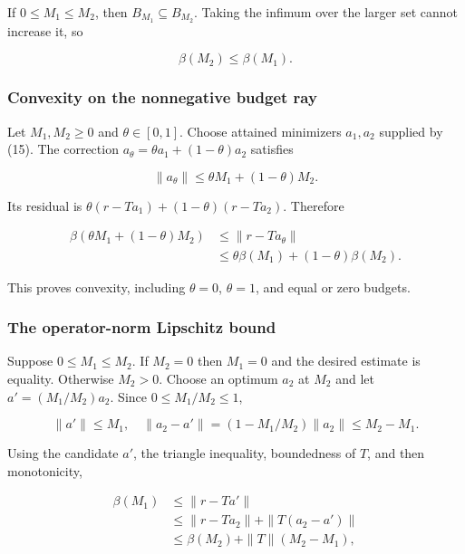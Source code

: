 \documentclass[11pt]{article}
\begin{document}
If \(0 \le M_1 \le M_2\), then \(B_{M_1} \subseteq B_{M_2}\). Taking the
infimum over the larger set cannot increase it, so

\[
\beta(M_2)\le\beta(M_1).
\]

\hypertarget{convexity-on-the-nonnegative-budget-ray}{%
\subsubsection{Convexity on the nonnegative budget
ray}\label{convexity-on-the-nonnegative-budget-ray}}

Let \(M_1,M_2 \ge 0\) and \(\theta \in [0,1]\). Choose attained
minimizers \(a_1,a_2\) supplied by (15). The correction
\(a_{\theta} = \theta a_1+(1-\theta )a_2\) satisfies

\[
\|a_\theta\|\le\theta M_1+(1-\theta)M_2.
\]

Its residual is \(\theta (r-Ta_1)+(1-\theta )(r-Ta_2)\). Therefore

\[
\begin{aligned}
\beta(\theta M_1+(1-\theta)M_2)
 &\le\|r-Ta_\theta\|\\
 &\le\theta\beta(M_1)+(1-\theta)\beta(M_2).
\end{aligned}
\]

This proves convexity, including \(\theta = 0\), \(\theta = 1\), and
equal or zero budgets.

\hypertarget{the-operator-norm-lipschitz-bound}{%
\subsubsection{The operator-norm Lipschitz
bound}\label{the-operator-norm-lipschitz-bound}}

Suppose \(0 \le M_1 \le M_2\). If \(M_2 = 0\) then \(M_1 = 0\) and the
desired estimate is equality. Otherwise \(M_2 > 0\). Choose an optimum
\(a_2\) at \(M_2\) and let \(a' = (M_1/M_2)a_2\). Since
\(0 \le M_1/M_2 \le 1\),

\[
\|a'\|\le M_1,
\quad
\|a_2-a'\|=(1-M_1/M_2)\|a_2\|\le M_2-M_1.
\]

Using the candidate \(a'\), the triangle inequality, boundedness of
\(T\), and then monotonicity,

\[
\begin{aligned}
\beta(M_1)
 &\le\|r-Ta'\|\\
 &\le\|r-Ta_2\|+\|T(a_2-a')\|\\
 &\le\beta(M_2)+\|T\|(M_2-M_1),
\end{aligned}
\]
\end{document}
